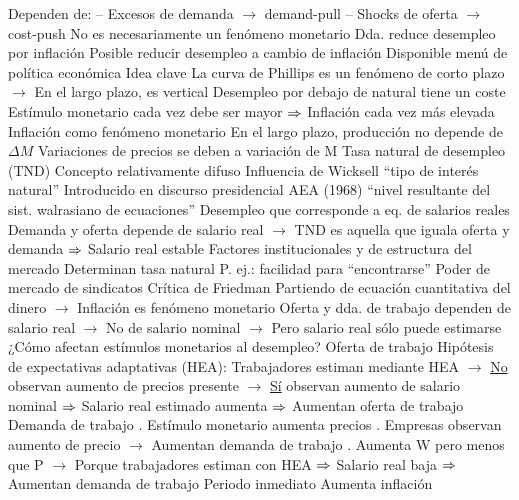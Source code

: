\documentclass{nuevotema}
\begin{document}
\begin{esquemal}
				\4[] Dependen de:
				\4[] -- Excesos de demanda
				\4[] $\to$ demand-pull
				\4[] -- Shocks de oferta
				\4[] $\to$ cost-push
				\4[$\then$] No es necesariamente un fenómeno monetario
				\4[$\then$] Dda. reduce desempleo por inflación
				\4[$\then$] Posible reducir desempleo a cambio de inflación
				\4[$\then$] Disponible menú de política económica
			\3 Idea clave
				\4 La curva de Phillips es un fenómeno de corto plazo
				\4[] $\to$ En el largo plazo, es vertical
				\4 Desempleo por debajo de natural tiene un coste
				\4[] Estímulo monetario cada vez debe ser mayor
				\4[] $\then$ Inflación cada vez más elevada
				\4 Inflación como fenómeno monetario
				\4[] En el largo plazo, producción no depende de $\Delta M$
				\4[] Variaciones de precios se deben a variación de M
			\3 Tasa natural de desempleo (TND)
				\4 Concepto relativamente difuso
				\4 Influencia de Wicksell
				\4[] ``tipo de interés natural''
				\4 Introducido en discurso presidencial AEA (1968)
				\4[] ``nivel resultante del sist. walrasiano de ecuaciones''
				\4 Desempleo que corresponde a eq. de salarios reales
				\4[] Demanda y oferta depende de salario real
				\4[] $\to$ TND es aquella que iguala oferta y demanda
				\4[] $\then$ Salario real estable
				\4 Factores institucionales y de estructura del mercado
				\4[] Determinan tasa natural
				\4[] P. ej.: facilidad para ``encontrarse''
				\4[] Poder de mercado de sindicatos
			\3 Crítica de Friedman
				\4 Partiendo de ecuación cuantitativa del dinero
				\4[] $\to$ Inflación es fenómeno monetario
				\4 Oferta y dda. de trabajo dependen de salario real
				\4[] $\to$ No de salario nominal
				\4[] $\to$ Pero salario real sólo puede estimarse
				\4[$\then$] ¿Cómo afectan estímulos monetarios al desempleo?
				\4 Oferta de trabajo
				\4[] Hipótesis de expectativas adaptativas (HEA):
				\4[] 
				\4[] Trabajadores estiman mediante HEA
				\4[] $\to$ \underline{No} observan aumento de precios presente
				\4[] $\to$ \underline{Sí} observan aumento de salario nominal
				\4[] $\then$ Salario real estimado aumenta
				\4[] $\then$ Aumentan oferta de trabajo
				\4 Demanda de trabajo
				. Estímulo monetario aumenta precios
				. Empresas observan aumento de precio
				\4[] $\to$ Aumentan demanda de trabajo
				. Aumenta W pero menos que P
				\4[] $\to$ Porque trabajadores estiman con HEA
				\4[] $\then$ Salario real baja
				\4[] $\then$ Aumentan demanda de trabajo
				\4 Periodo inmediato
				\4[] Aumenta inflación

\end{esquemal}
\end{document}
